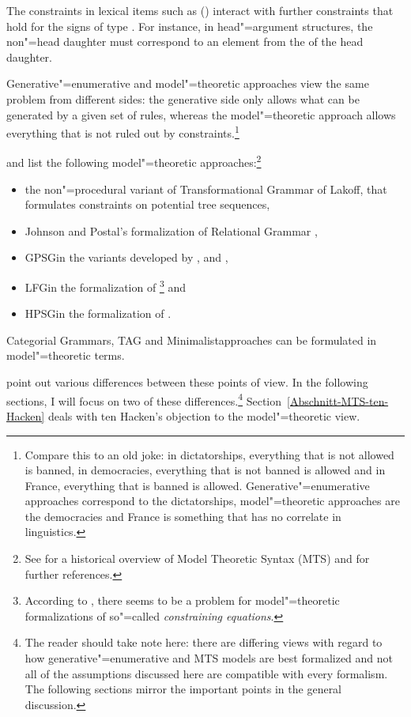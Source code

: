 The constraints in lexical items such as () interact with further constraints that hold for the signs of type
. For instance, in head"=argument structures, the non"=head daughter must correspond to an element from the \compsl of
the head daughter.

\addlines[-1]
Generative"=enumerative and model"=theoretic approaches view the same problem from different sides: the generative side only
allows what can be generated by a given set of rules, whereas the model"=theoretic approach allows everything that is not ruled out
by constraints.\footnote{%
Compare this to an old joke: in dictatorships, everything that is not allowed is banned, in democracies, everything
that is not banned is allowed and in France, everything that is banned is allowed. Generative"=enumerative approaches correspond
to the dictatorships, model"=theoretic approaches are the democracies and France is something that has no correlate in linguistics.
}

\citet[--20]{PS2001a} and \citet{Pullum2007a} list the following model"=theoretic approaches:\footnote{%
  See  for a historical overview of Model Theoretic Syntax (MTS) and for further references.
}
\begin{itemize}
\item the non"=procedural variant of Transformational Grammar of
  Lakoff, that formulates
constraints on potential tree sequences,
\item Johnson and Postal's formalization of Relational Grammar \citeyearpar{JP80a-u}, 
\item GPSG\indexgpsg in the variants developed by \citet{GPCKHL88a}, \citet{BGM93a-u} and \citet{Rogers97a},
\item LFG\indexlfg in the formalization of \citet{Kaplan89b}\footnote{%
  According to \citet[Section~3.2]{Pullum2013a}, there seems to be a problem for model"=theoretic formalizations of so"=called
  \emph{constraining equations}.
} and   
\item HPSG\indexhpsg in the formalization of \citet{King99a-u}.
\end{itemize}
Categorial Grammars\indexcg \citep{BvN94a-u}, TAG\indextag \citep{RVS94a-u} and
Minimalist\indexmp approaches \citep{Veenstra98a} can be formulated in model"=theoretic terms.

\citet{PS2001a} point out various differences between these points of view. In the following sections, I will focus on two of these differences.\footnote{%
	The reader should take note here: there are differing views with regard to how generative"=enumerative and MTS models are best formalized and not
	all of the assumptions discussed here are compatible with every formalism. The following sections mirror the important points in the general discussion.%
} Section~\ref{Abschnitt-MTS-ten-Hacken} deals with ten Hacken's objection to the model"=theoretic view.

